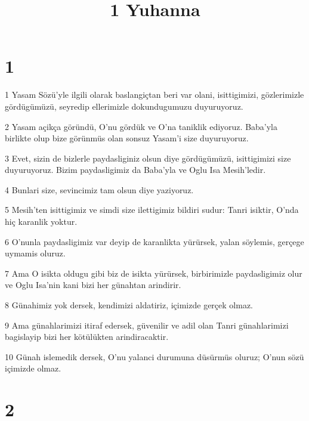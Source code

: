 

\title{1 Yuhanna}


\chapter{1}

\par 1 Yasam Sözü'yle ilgili olarak baslangiçtan beri var olani, isittigimizi, gözlerimizle gördügümüzü, seyredip ellerimizle dokundugumuzu duyuruyoruz.
\par 2 Yasam açikça göründü, O'nu gördük ve O'na taniklik ediyoruz. Baba'yla birlikte olup bize görünmüs olan sonsuz Yasam'i size duyuruyoruz.
\par 3 Evet, sizin de bizlerle paydasliginiz olsun diye gördügümüzü, isittigimizi size duyuruyoruz. Bizim paydasligimiz da Baba'yla ve Oglu Isa Mesih'ledir.
\par 4 Bunlari size, sevincimiz tam olsun diye yaziyoruz.
\par 5 Mesih'ten isittigimiz ve simdi size ilettigimiz bildiri sudur: Tanri isiktir, O'nda hiç karanlik yoktur.
\par 6 O'nunla paydasligimiz var deyip de karanlikta yürürsek, yalan söylemis, gerçege uymamis oluruz.
\par 7 Ama O isikta oldugu gibi biz de isikta yürürsek, birbirimizle paydasligimiz olur ve Oglu Isa'nin kani bizi her günahtan arindirir.
\par 8 Günahimiz yok dersek, kendimizi aldatiriz, içimizde gerçek olmaz.
\par 9 Ama günahlarimizi itiraf edersek, güvenilir ve adil olan Tanri günahlarimizi bagislayip bizi her kötülükten arindiracaktir.
\par 10 Günah islemedik dersek, O'nu yalanci durumuna düsürmüs oluruz; O'nun sözü içimizde olmaz.

\chapter{2}

